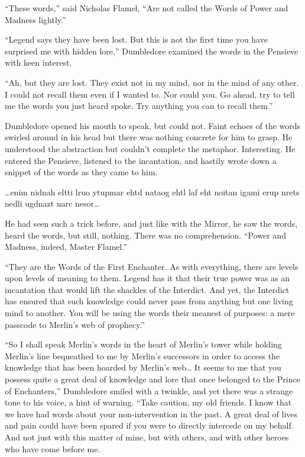 “These words,” said Nicholas Flamel, “Are not called the Words of Power and Madness lightly.”

“Legend says they have been lost. But this is not the first time you have surprised me with hidden lore,” Dumbledore examined the words in the Pensieve with keen interest.

“Ah, but they are lost. They exist not in my mind, nor in the mind of any other. I could not recall them even if I wanted to. Nor could you. Go ahead, try to tell me the words you just heard spoke. Try anything you can to recall them.”

Dumbledore opened his mouth to speak, but could not. Faint echoes of the words swirled around in his head but there was nothing concrete for him to grasp. He understood the abstraction but couldn’t complete the metaphor. Interesting. He entered the Pensieve, listened to the incantation, and hastily wrote down a snippet of the words as they came to him.

…enim nidnah eltti lruo ytupmar ehtd nataog ehtl laf eht noitan igami erup nrets nedli ugdnazt narc nesor…

He had seen such a trick before, and just like with the Mirror, he saw the words, heard the words, but still, nothing. There was no comprehension. “Power and Madness, indeed, Master Flamel.”

“They are the Words of the First Enchanter. As with everything, there are levels upon levels of meaning to them. Legend has it that their true power was as an incantation that would lift the shackles of the Interdict. And yet, the Interdict has ensured that such knowledge could never pass from anything but one living mind to another. You will be using the words their meanest of purposes: a mere passcode to Merlin’s web of prophecy.”

“So I shall speak Merlin’s words in the heart of Merlin’s tower while holding Merlin’s line bequeathed to me by Merlin’s successors in order to access the knowledge that has been hoarded by Merlin’s web… It seems to me that you possess quite a great deal of knowledge and lore that once belonged to the Prince of Enchanters,” Dumbledore smiled with a twinkle, and yet there was a strange tone to his voice, a hint of warning. “Take caution, my old friends. I know that we have had words about your non-intervention in the past. A great deal of lives and pain could have been spared if you were to directly intercede on my behalf. And not just with this matter of mine, but with others, and with other heroes who have come before me.

